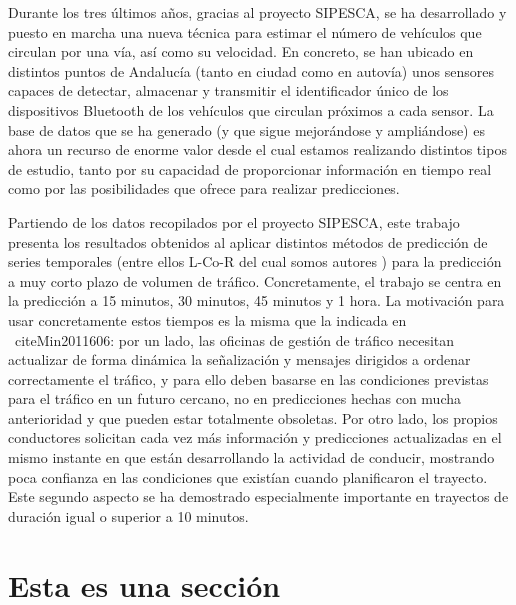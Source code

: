 \documentclass[twocolumn]{maeb2015}
\begin{document}
Durante los tres últimos años, gracias al proyecto SIPESCA, se ha desarrollado y puesto en marcha una nueva técnica para estimar el número de vehículos que circulan por una vía, así como su velocidad. En concreto, se han ubicado en distintos puntos de Andalucía (tanto en ciudad como en autovía) unos sensores capaces de detectar, almacenar y transmitir el identificador único de los dispositivos Bluetooth de los vehículos que circulan próximos a cada sensor. La base de datos que se ha generado (y que sigue mejorándose y ampliándose) es ahora un recurso de enorme valor desde el cual estamos realizando distintos tipos de estudio, tanto por su capacidad de proporcionar información en tiempo real como por las posibilidades que ofrece para realizar predicciones.

Partiendo de los datos recopilados por el proyecto SIPESCA, este trabajo presenta los resultados obtenidos al aplicar distintos métodos de predicción de series temporales (entre ellos {L-Co-R} del cual somos autores \cite{LCOR}) para la predicción a muy corto plazo de volumen de tráfico. Concretamente, el trabajo se centra en la predicción a 15 minutos, 30 minutos, 45 minutos y 1 hora. La motivación para usar concretamente estos tiempos es la misma que la indicada en ~cite{Min2011606}: por un lado, las oficinas de gestión de tráfico necesitan actualizar de forma dinámica la señalización y mensajes dirigidos a ordenar correctamente el tráfico, y para ello deben basarse en las condiciones previstas para el tráfico en un futuro cercano, no en predicciones hechas con mucha anterioridad y que pueden estar totalmente obsoletas. Por otro lado, los propios conductores solicitan cada vez más información y predicciones actualizadas en el mismo instante en que están desarrollando la actividad de conducir, mostrando poca confianza en las condiciones que existían cuando planificaron el trayecto. Este segundo aspecto se ha demostrado especialmente importante en trayectos de duración igual o superior a 10 minutos.




\section{Esta es una sección}
\end{document}
